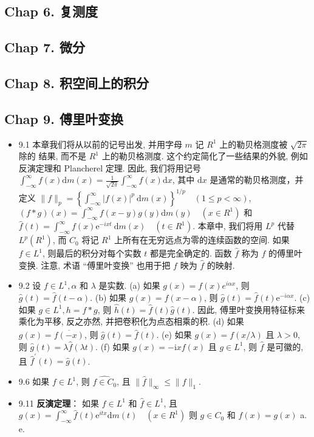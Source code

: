 \subsection{Chap 6. 复测度}

\subsection{Chap 7. 微分}

\subsection{Chap 8. 积空间上的积分}

\subsection{Chap 9. 傅里叶变换}

\begin{itemize}
\item 9.1 本章我们将从以前的记号出发, 并用字母 $m$ 记 $R^{1}$ 上的勒贝格测度被 $\sqrt{2 \pi}$ 除的 结果, 而不是 $R^{1}$ 上的勒贝格测度. 这个约定简化了一些结果的外貌, 例如反演定理和 Plancherel 定理. 因此, 我们将用记号 $\int_{-\infty}^{\infty} f(x) \mathrm{d} m(x)=\frac{1}{\sqrt{2 \pi}} \int_{-\infty}^{\infty} f(x) \mathrm{d} x$, 其中 $\mathrm{d} x$ 是通常的勒贝格测度，并定义 $\|f\|_{p}=\left\{\int_{-\infty}^{\infty}|f(x)|^{p} \mathrm{~d} m(x)\right\}^{1 / p} \quad(1 \leqslant p<\infty)$, $(f * g)(x)=\int_{-\infty}^{\infty} f(x-y) g(y) \mathrm{d} m(y) \quad\left(x \in R^{1}\right)$ 和 $\hat{f}(t)=\int_{-\infty}^{\infty} f(x) \mathrm{e}^{-i xt} \mathrm{~d} m(x) \quad\left(t \in R^{1}\right)$. 本章中, 我们将用 $L^{p}$ 代替 $L^{p}\left(R^{1}\right)$, 而 $C_{0}$ 将记 $R^{1}$ 上所有在无穷远点为零的连续函数的空间. 如果 $f \in L^{1}$, 则最后的积分对每个实数 $t$ 都是完全确定的. 函数 $\hat{f}$ 称为 $f$ 的傅里叶变换. 注意, 术语 “傅里叶变换” 也用于把 $f$ 映为 $\hat{f}$ 的映射.

\item 9.2 设 $f \in L^{1}, \alpha$ 和 $\lambda$ 是实数. (a) 如果 $g(x)=f(x) e^{i \alpha x}$, 则 $\hat{g}(t)=\hat{f}(t-\alpha)$. (b) 如果 $g(x)=f(x-\alpha)$, 则 $\hat{g}(t)=\hat{f}(t) \mathrm{e}^{-i\alpha x}$. (c) 如果 $g \in L^{1}, h=f * g$, 则 $\hat{h}(t)=\hat{f}(t) \hat{g}(t)$. 因此, 傅里叶变换用特征标来乘化为平移, 反之亦然, 并把卷积化为点态相乘的积. (d) 如果 $g(x)=\overline{f(-x)}$, 则 $\hat{g}(t)=\overline{\hat{f}(t)}$. (e) 如果 $g(x)=f(x / \lambda)$ 且 $\lambda>0$, 则 $\hat{g}(t)=\lambda \hat{f}(\lambda t)$. (f) 如果 $g(x)=-\mathrm{i} x f(x)$ 且 $g \in L^{1}$, 则 $\hat{f}$ 是可徽的, 且 $\hat{f}^{\prime}(t)=\hat{g}(t)$.

\item 9.6 如果 $f \in L^{1}$, 则 $\hat{f \in C_{0}}$, 且 $\|\hat{f}\|_{\infty} \leqslant\|f\|_{1}$.

\item 9.11 \textbf{反演定理}： 如果 $f \in L^{1}$ 和 $\hat{f} \in L^{1}$, 且 $g(x)=\int_{-\infty}^{\infty} \hat{f}(t) \mathrm{e}^{itx} \mathrm{d} m(t) \quad\left(x \in R^{1}\right)$ 则 $g \in C_{0}$ 和 $f(x)=g(x)$ a. e.
\end{itemize}


